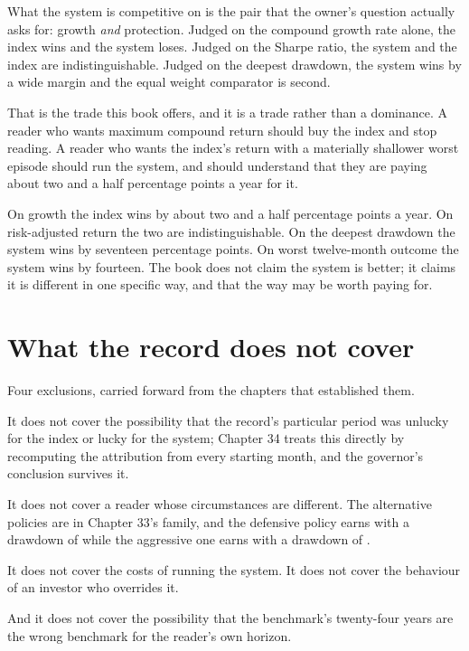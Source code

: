 What the system is competitive on is the pair that the owner's question
actually asks for: growth \emph{and} protection. Judged on the compound
growth rate alone, the index wins and the system loses. Judged on the
Sharpe ratio, the system and the index are indistinguishable. Judged on
the deepest drawdown, the system wins by a wide margin and the equal
weight comparator is second.

That is the trade this book offers, and it is a trade rather than a
dominance. A reader who wants maximum compound return should buy the
index and stop reading. A reader who wants the index's return with a
materially shallower worst episode should run the system, and should
understand that they are paying about two and a half percentage points a
year for it.

\begin{takeaway}
On growth the index wins by about two and a half percentage points a year.
On risk-adjusted return the two are indistinguishable. On the deepest
drawdown the system wins by seventeen percentage points. On worst
twelve-month outcome the system wins by fourteen. The book does not claim
the system is better; it claims it is different in one specific way, and
that the way may be worth paying for.
\end{takeaway}

\section{What the record does not cover}

Four exclusions, carried forward from the chapters that established them.

It does not cover the possibility that the record's particular period was
unlucky for the index or lucky for the system; Chapter 34 treats this
directly by recomputing the attribution from every starting month, and
the governor's conclusion survives it.

It does not cover a reader whose circumstances are different. The
alternative policies are in Chapter 33's family, and the defensive policy
earns \numDefCAGR{} with a drawdown of \numDefDD{} while the aggressive one
earns \numAggCAGR{} with a drawdown of \numAggDD{}.

It does not cover the costs of running the system. It does not cover the
behaviour of an investor who overrides it.

And it does not cover the possibility that the benchmark's twenty-four
years are the wrong benchmark for the reader's own horizon.

